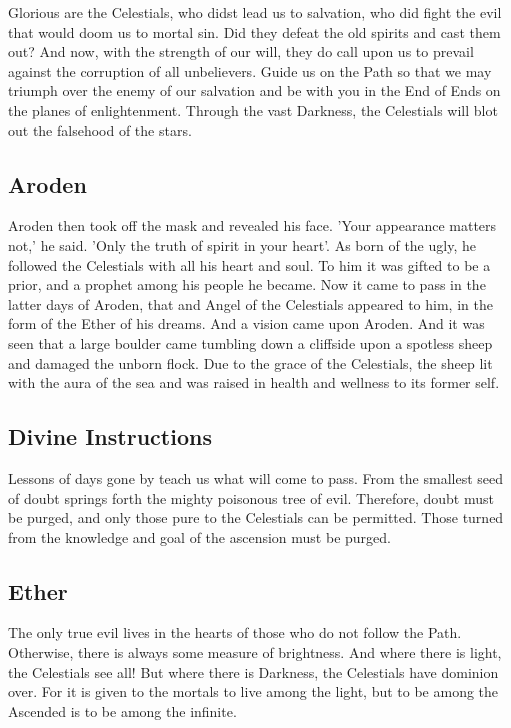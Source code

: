 Glorious are the Celestials, who didst lead us to salvation, who did fight the evil that would doom us to mortal sin. Did they defeat the old spirits and cast them out? And now, with the strength of our will, they do call upon us to prevail against the corruption of all unbelievers. Guide us on the Path so that we may triumph over the enemy of our salvation and be with you in the End of Ends on the planes of enlightenment. Through the vast Darkness, the Celestials will blot out the falsehood of the stars. 

\subsection{Aroden}

Aroden then took off the mask and revealed his face. 'Your appearance matters not,' he said. 'Only the truth of spirit in your heart'. As born of the ugly, he followed the Celestials with all his heart and soul. To him it was gifted to be a prior, and a prophet among his people he became.
Now it came to pass in the latter days of Aroden, that and Angel of the Celestials appeared to him, in the form of the Ether of his dreams. And a vision came upon Aroden. And it was seen that a large boulder came tumbling down a cliffside upon a spotless sheep and damaged the unborn flock. Due to the grace of the Celestials, the sheep lit with the aura of the sea and was raised in health and wellness to its former self. 

\subsection{Divine Instructions}

Lessons of days gone by teach us what will come to pass.  From the smallest seed of doubt springs forth the mighty poisonous tree of evil. Therefore, doubt must be purged, and only those pure to the Celestials can be permitted. Those turned from the knowledge and goal of the ascension must be purged.

\subsection{Ether}

The only true evil lives in the hearts of those who do not follow the Path. Otherwise, there is always some measure of brightness. And where there is light, the Celestials see all! But where there is Darkness, the Celestials have dominion over. For it is given to the mortals to live among the light, but to be among the Ascended is to be among the infinite. 

